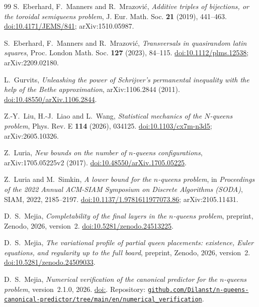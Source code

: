 \begin{thebibliography}{99}
 S.~Eberhard, F.~Manners and R.~Mrazović, \emph{Additive triples of bijections, or the
toroidal semiqueens problem}, J. Eur. Math. Soc. \textbf{21} (2019), 441--463.
\href{https://doi.org/10.4171/JEMS/841}{doi:10.4171/JEMS/841}; arXiv:1510.05987.

 S.~Eberhard, F.~Manners and R.~Mrazović, \emph{Transversals in quasirandom latin squares},
Proc. London Math. Soc. \textbf{127} (2023), 84--115.
\href{https://doi.org/10.1112/plms.12538}{doi:10.1112/plms.12538};
arXiv:2209.02180.

 L.~Gurvits, \emph{Unleashing the power of Schrijver's permanental inequality with
the help of the Bethe approximation}, arXiv:1106.2844 (2011).
\href{https://doi.org/10.48550/arXiv.1106.2844}{doi:10.48550/arXiv.1106.2844}.

 Z.-Y.~Liu, H.-J.~Liao and L.~Wang, \emph{Statistical mechanics of the $N$-queens problem},
Phys. Rev. E \textbf{114} (2026), 034125.
\href{https://doi.org/10.1103/cx7m-n3d5}{doi:10.1103/cx7m-n3d5}; arXiv:2605.10326.

 Z.~Luria, \emph{New bounds on the number of $n$-queens configurations},
arXiv:1705.05225v2 (2017).
\href{https://doi.org/10.48550/arXiv.1705.05225}{doi:10.48550/arXiv.1705.05225}.

 Z.~Luria and M.~Simkin, \emph{A lower bound for the $n$-queens problem}, in
\emph{Proceedings of the 2022 Annual ACM-SIAM Symposium on Discrete Algorithms (SODA)}, SIAM, 2022,
2185--2197.
\href{https://doi.org/10.1137/1.9781611977073.86}{doi:10.1137/1.9781611977073.86};
arXiv:2105.11431.

 D.~S.~Mejia, \emph{Completability of the final layers in the $n$-queens problem},
preprint, Zenodo, 2026, version~2.
\href{https://doi.org/10.5281/zenodo.24513225}{doi:10.5281/zenodo.24513225}.

 D.~S.~Mejia, \emph{The variational profile of partial queen placements: existence,
Euler equations, and regularity up to the full board}, preprint, Zenodo, 2026, version~2.
\href{https://doi.org/10.5281/zenodo.24509033}{doi:10.5281/zenodo.24509033}.

 D.~S.~Mejia, \emph{Numerical verification of the canonical predictor for the $n$-queens
problem}, version~2.1.0, 2026.
\ifx\DOIcodigo\empty\else\href{https://doi.org/\DOIcodigo}{doi:\DOIcodigo}. \fi
Repository:
\href{https://github.com/Dilanst/n-queens-canonical-predictor/tree/main/en/numerical_verification}%
{\nolinkurl{github.com/Dilanst/n-queens-canonical-predictor/tree/main/en/numerical_verification}}.


\end{thebibliography}
